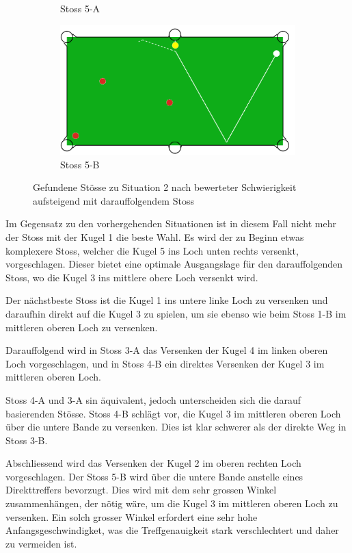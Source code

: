 \begin{figure}[h!]
\begin{subfigure}[b]{0.4\textwidth}
        \caption{Stoss 5-A}
        \label{fig:situation_2_solution_5a}
    \end{subfigure}
    \hfill
    \begin{subfigure}[b]{0.4\textwidth}
        \centering
        \includegraphics[width=1.0\linewidth]{../common/04_results/resources/simple_search/situation_diverse_solution_deep_search_5b.PNG}
        \caption{Stoss 5-B}
        \label{fig:situation_2_solution_5b}
    \end{subfigure}
    \caption{Gefundene Stösse zu Situation 2 nach bewerteter Schwierigkeit aufsteigend mit darauffolgendem Stoss}
    \label{fig:situation_2_solutions}
\end{figure}

Im Gegensatz zu den vorhergehenden Situationen ist in diesem Fall nicht mehr der Stoss mit der Kugel 1
die beste Wahl. Es wird der zu Beginn etwas komplexere Stoss, welcher die Kugel 5 ins Loch unten
rechts versenkt, vorgeschlagen. Dieser bietet eine optimale Ausgangslage für den darauffolgenden Stoss,
wo die Kugel 3 ins mittlere obere Loch versenkt wird.

Der nächstbeste Stoss ist die Kugel 1 ins untere linke Loch zu versenken und
daraufhin direkt auf die Kugel 3 zu spielen, um sie ebenso wie beim Stoss 1-B im mittleren oberen Loch zu versenken.

Darauffolgend wird in Stoss 3-A das Versenken der Kugel 4 im linken oberen Loch vorgeschlagen, und in Stoss 4-B ein
direktes Versenken der Kugel 3 im mittleren oberen Loch.

Stoss 4-A und 3-A sin äquivalent, jedoch unterscheiden sich die darauf basierenden Stösse. Stoss 4-B schlägt vor, die
Kugel 3 im mittleren oberen Loch über die untere Bande zu versenken. Dies ist klar schwerer als der direkte Weg in Stoss
3-B.

Abschliessend wird das Versenken der Kugel 2 im oberen rechten Loch vorgeschlagen.
Der Stoss 5-B wird über die untere Bande anstelle eines Direkttreffers bevorzugt.
Dies wird mit dem sehr grossen Winkel zusammenhängen, der nötig wäre, um die Kugel 3 im
mittleren oberen Loch zu versenken. Ein solch grosser Winkel erfordert eine sehr hohe
Anfangsgeschwindigket, was die Treffgenauigkeit stark verschlechtert und daher zu vermeiden ist.

